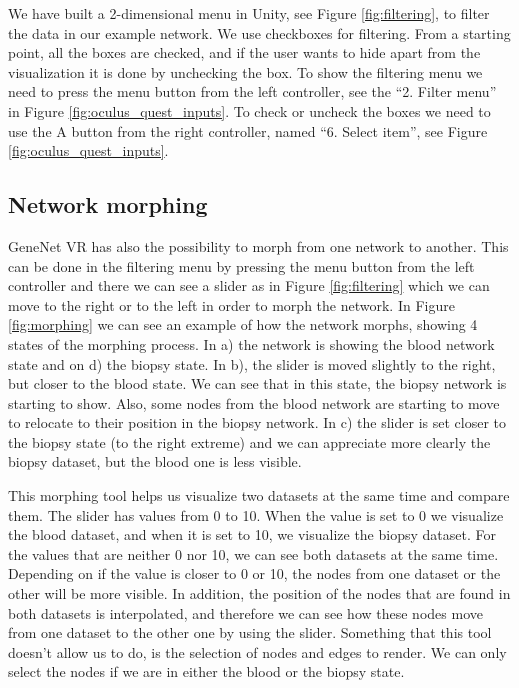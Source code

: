 We have built a 2-dimensional menu in Unity, see Figure \ref{fig:filtering}, to filter the data in our example network. We use checkboxes for filtering. From a starting point, all the boxes are checked, and if the user wants to hide apart from the visualization it is done by unchecking the box. To show the filtering menu we need to press the menu button from the left controller, see the “2. Filter menu” in Figure \ref{fig:oculus_quest_inputs}. To check or uncheck the boxes we need to use the A button from the right controller, named “6. Select item”, see Figure \ref{fig:oculus_quest_inputs}.

\subsection{Network morphing}
GeneNet VR has also the possibility to morph from one network to another. This can be done in the filtering menu by pressing the menu button from the left controller and there we can see a slider as in Figure \ref{fig:filtering} which we can move to the right or to the left in order to morph the network. In Figure \ref{fig:morphing} we can see an example of how the network morphs, showing 4 states of the morphing process. In a) the network is showing the blood network state and on d) the biopsy state. In b), the slider is moved slightly to the right, but closer to the blood state. We can see that in this state, the biopsy network is starting to show. Also, some nodes from the blood network are starting to move to relocate to their position in the biopsy network. In c) the slider is set closer to the biopsy state (to the right extreme) and we can appreciate more clearly the biopsy dataset, but the blood one is less visible.

This morphing tool helps us visualize two datasets at the same time and compare them. The slider has values from 0 to 10. When the value is set to 0 we visualize the blood dataset, and when it is set to 10, we visualize the biopsy dataset. For the values that are neither 0 nor 10, we can see both datasets at the same time. Depending on if the value is closer to 0 or 10, the nodes from one dataset or the other will be more visible. In addition, the position of the nodes that are found in both datasets is interpolated, and therefore we can see how these nodes move from one dataset to the other one by using the slider. Something that this tool doesn't allow us to do, is the selection of nodes and edges to render. We can only select the nodes if we are in either the blood or the biopsy state.

